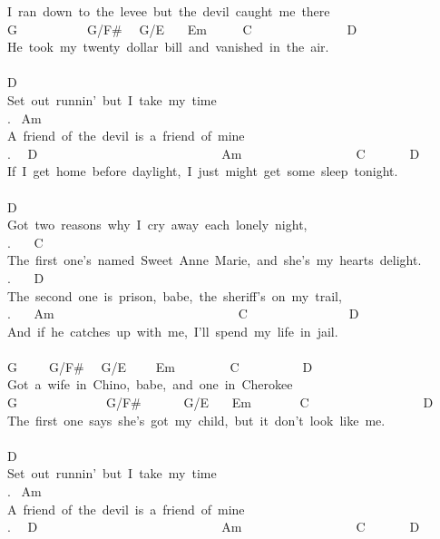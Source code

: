 {I\ ran\ down\ to\ the\ levee\ but\ the\ devil\ caught\ me\ there\\
G\ \ \ \ \ \ \ \ \ \ \ G/F\# \ \ G/E \ \ \ Em \ \ \ \ \ C\ \ \ \ \ \ \ \ \ \ \ \ \ \ \ D\\
He\ took\ my\ twenty\ dollar\ bill\ and\ vanished\ in\ the\ air.\\
\\
D\\
Set\ out\ runnin'\ but\ I\ take\ my\ time\\
. \ Am\\
A\ friend\ of\ the\ devil\ is\ a\ friend\ of\ mine\\
. \ \ D\ \ \ \ \ \ \ \ \ \ \ \ \ \ \ \ \ \ \ \ \ \ \ \ \ \ \ \ \ Am\ \ \ \ \ \ \ \ \ \ \ \ \ \ \ \ \ \ C\ \ \ \ \ \ \ D\\
If\ I\ get\ home\ before\ daylight,\ I\ just\ might\ get\ some\ sleep\ tonight.\\
\\
D\\
Got\ two\ reasons\ why\ I\ cry\ away\ each\ lonely\ night,\\
. \ \ \ C\\
The\ first\ one's\ named\ Sweet\ Anne\ Marie,\ and\ she's\ my\ hearts\ delight.\\
. \ \ \ D\\
The\ second\ one\ is\ prison,\ babe,\ the\ sheriff's\ on\ my\ trail,\\
. \ \ \ Am\ \ \ \ \ \ \ \ \ \ \ \ \ \ \ \ \ \ \ \ \ \ \ \ \ \ \ \ \ C\ \ \ \ \ \ \ \ \ \ \ \ \ \ \ \ D\\
And\ if\ he\ catches\ up\ with\ me,\ I'll\ spend\ my\ life\ in\ jail.\\
\\
G\ \ \ \ \ G/F\# \ \ G/E \ \ \ \ Em \ \ \ \ \ \ \ \ C\ \ \ \ \ \ \ \ \ \ D\\
Got\ a\ wife\ in\ Chino,\ babe,\ and\ one\ in\ Cherokee\\
G\ \ \ \ \ \ \ \ \ \ \ \ \ \ G/F\# \ \ \ \ \ \ G/E \ \ \ Em \ \ \ \ \ \ \ C\ \ \ \ \ \ \ \ \ \ \ \ \ \ \ \ \ \ D\\
The\ first\ one\ says\ she's\ got\ my\ child,\ but\ it\ don't\ look\ like\ me.\\
\\
D\\
Set\ out\ runnin'\ but\ I\ take\ my\ time\\
. \ Am\\
A\ friend\ of\ the\ devil\ is\ a\ friend\ of\ mine\\
. \ \ D\ \ \ \ \ \ \ \ \ \ \ \ \ \ \ \ \ \ \ \ \ \ \ \ \ \ \ \ \ Am\ \ \ \ \ \ \ \ \ \ \ \ \ \ \ \ \ \ C\ \ \ \ \ \ \ D\\
}
